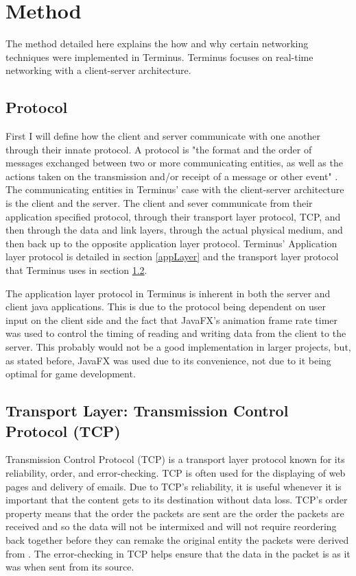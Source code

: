\documentclass[12pt]{article}
\begin{document}
\section{Method}
    The method detailed here explains the how and why certain networking techniques were implemented in Terminus. Terminus focuses on real-time networking with a client-server architecture.

\subsection{Protocol}
    First I will define how the client and server communicate with one another through their innate protocol. A protocol is "the format and the order of messages exchanged between two or more communicating entities, as well as the actions taken on the transmission and/or receipt of a message or other event" \cite{kurose}. The communicating entities in Terminus' case with the client-server architecture is the client and the server. The client and sever communicate from their application specified protocol, through their transport layer protocol, TCP, and then through the data and link layers, through the actual physical medium, and then back up to the opposite application layer protocol. Terminus' Application layer protocol is detailed in section \ref{appLayer} and the transport layer protocol that Terminus uses in section \ref{tcp}.
    
    The application layer protocol in Terminus is inherent in both the server and client java applications. This is due to the protocol being dependent on user input on the client side and the fact that JavaFX's animation frame rate timer was used to control the timing of reading and writing data from the client to the server. This probably would not be a good implementation in larger projects, but, as stated before, JavaFX was used due to its convenience, not due to it being optimal for game development.
    
\subsection{Transport Layer: Transmission Control Protocol (TCP)}\label{tcp}
    Transmission Control Protocol (TCP) is a transport layer protocol known for its reliability, order, and error-checking. TCP is often used for the displaying of web pages and delivery of emails. Due to TCP's reliability, it is useful whenever it is important that the content gets to its destination without data loss. TCP's order property means that the order the packets are sent are the order the packets are received and so the data will not be intermixed and will not require reordering back together before they can remake the original entity the packets were derived from \cite{kurose}. The error-checking in TCP helps ensure that the data in the packet is as it was when sent from its source.
\end{document}
